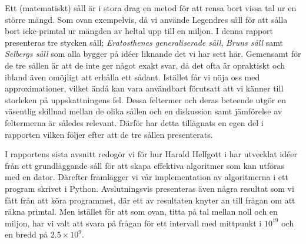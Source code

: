 Ett (matematiskt) såll är i stora drag en metod för att rensa bort vissa tal ur en större mängd.
Som ovan exempelvis, då vi använde Legendres såll för att sålla bort icke-primtal ur mängden av heltal upp till en miljon.
I denna rapport presenteras tre stycken såll;
\textit{Eratosthenes generaliserade såll}, \textit{Bruns såll} samt \textit{Selbergs såll} som alla bygger på idéer liknande det vi har sett här.
Gemensamt för de tre sållen är att de inte ger något exakt svar, då det ofta är opraktiskt och ibland även omöjligt att erhålla ett sådant.
Istället får vi nöja oss med approximationer, vilket ändå kan vara användbart förutsatt att vi känner till storleken på uppskattningens fel.
Dessa feltermer och deras beteende utgör en väsentlig skillnad mellan de olika sållen och en diskussion samt jämförelse av feltermerna är således relevant. Därför har detta tillägnats en egen del i rapporten vilken följer efter att de tre sållen presenterats.


I rapportens sista avsnitt redogör vi för hur Harald Helfgott i \cite{HaraldSieve} har utvecklat idéer från ett grundläggande såll för att skapa effektiva algoritmer som kan utföras med en dator. 
Därefter framlägger vi vår implementation av algoritmerna i ett program skrivet i Python.
Avslutningsvis presenteras även några resultat som vi fått från att köra programmet,
där ett av resultaten knyter an till frågan om att räkna primtal.
Men istället för att som ovan, titta på tal mellan noll och en miljon, har vi valt att svara på frågan för ett intervall med mittpunkt i $10^{19}$ och en bredd på $2.5\times10^9$.